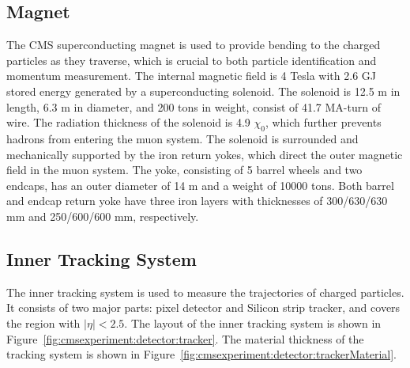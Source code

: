 


\subsection{Magnet}
The CMS superconducting magnet \cite{cms:magnetTdr:Acquistapace:1997fm} is used to provide bending to the charged particles as they traverse, which is crucial to both particle identification and momentum measurement. The internal magnetic field is 4 Tesla with 2.6 GJ stored energy generated by a superconducting solenoid. The solenoid is 12.5 m in length, 6.3 m in diameter, and 200 tons in weight, consist of 41.7 MA-turn of wire. The radiation thickness of the solenoid is 4.9 $\chi_0$, which further prevents hadrons from entering the muon system. The solenoid is surrounded and mechanically supported by the iron return yokes, which direct the outer magnetic field in the muon system. The yoke, consisting of 5 barrel wheels and two endcaps, has an outer diameter of 14 m and a weight of 10000 tons. Both barrel and endcap return yoke have three iron layers with thicknesses of 300/630/630 mm and 250/600/600 mm, respectively.


\subsection{Inner Tracking System}
The inner tracking system \cite{cms:trackerTdr:CMS:1997tlf} is used to measure the trajectories of charged particles. It consists of two major parts: pixel detector and Silicon strip tracker, and covers the region with $|\eta|<2.5$. The layout of the inner tracking system is shown in Figure~\ref{fig:cmsexperiment:detector:tracker}.  The material thickness of the tracking system is shown in Figure~\ref{fig:cmsexperiment:detector:trackerMaterial}.


